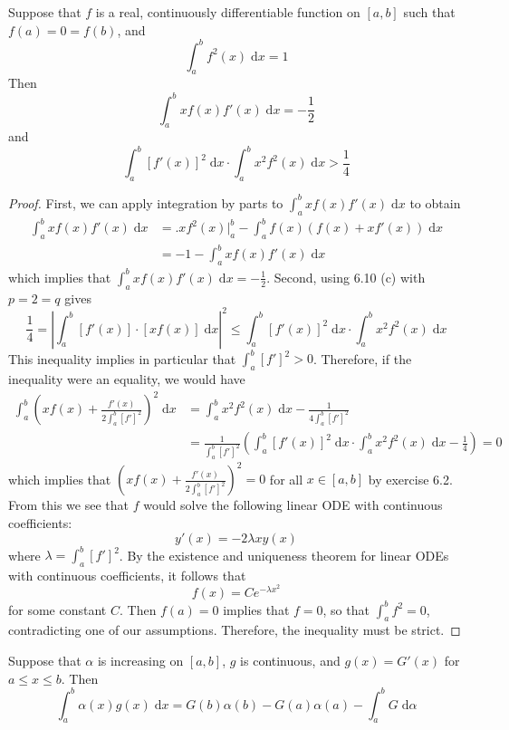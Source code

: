 \documentclass{homework}
\begin{document}
	
	Suppose that $f$ is a real, continuously differentiable function on $[a,b]$ such that $f(a) = 0 = f(b)$, and 
	$$
	\int_a^bf^2(x)\;\text{d}x = 1
	$$
	Then
	$$
	\int_a^bxf(x)f'(x)\;\text{d}x = -\frac{1}{2}
	$$
	and
	$$
	\int_a^b[f'(x)]^2\;\text{d}x \cdot\int_a^b x^2f^2(x)\;\text{d}x > \frac{1}{4} 
	$$
	
	\begin{proof}
		First, we can apply integration by parts to $\int_a^b xf(x)f'(x)\;\text{d}x$ to obtain
		$$
		\begin{aligned}
			\int_a^bxf(x)f'(x)\;\text{d}x &= \Big.xf^2(x)\Big|_a^b - \int_a^b f(x)(f(x) + xf'(x))\;\text{d}x\\
			&= -1 - \int_a^b xf(x)f'(x)\;\text{d}x
		\end{aligned}
		$$
		which implies that $\int_a^b xf(x)f'(x)\;\text{d}x = -\frac{1}{2}$. Second, using 6.10 (c) with $p = 2 = q$ gives
		$$
		\frac{1}{4} = \left|\int_a^b [f'(x)]\cdot[xf(x)]\;\text{d}x\right|^2 \le \int_a^b [f'(x)]^2\;\text{d}x \cdot \int_a^bx^2f^2(x)\;\text{d}x
		$$This inequality implies in particular that $\int_a^b [f']^2 > 0$. Therefore, if the inequality were an equality, we would have
		$$
		\begin{aligned}
			\int_a^b \left(xf(x) + \frac{f'(x)}{2\int_a^b[f']^2}\right)^2\;\text{d}x &= 
			\int_a^bx^2f^2(x)\;\text{d}x - \frac{1}{4\int_a^b [f']^2}\\
			&= \frac{1}{\int_a^b[f']^2}\left(\int_a^b [f'(x)]^2\;\text{d}x\cdot\int_a^b x^2f^2(x)\;\text{d}x - \frac{1}{4}\right) = 0
		\end{aligned}
		$$
		which implies that $\left(xf(x) + \frac{f'(x)}{2\int_a^b [f']^2}\right)^2 = 0$ for all $x \in [a,b]$ by exercise 6.2. From this we see that $f$ would solve the following linear ODE with continuous coefficients:
		$$
		y'(x) = -2\lambda xy(x)
		$$
		where $\lambda = \int_a^b[f']^2$. By the existence and uniqueness theorem for linear ODEs with continuous coefficients, it follows that
		$$
		f(x) = Ce^{-\lambda x^2}
		$$
		for some constant $C$. Then $f(a) = 0$ implies that $f = 0$, so that $\int_a^b f^2 =0$, contradicting one of our assumptions. Therefore, the inequality must be strict.
	\end{proof}
	
	
	Suppose that $\alpha$ is increasing on $[a,b]$, $g$ is continuous, and $g(x) = G'(x)$ for $a \le x \le b$. Then
	\begin{equation}
	\tag{1}
	\int_a^b\alpha(x)g(x) \;\text{d}x = G(b)\alpha(b) - G(a)\alpha(a) - \int_a^b G \;\text{d}\alpha
	\end{equation}
		
\end{document}
